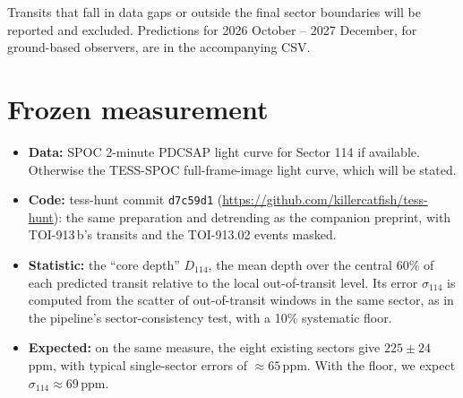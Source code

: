 \documentclass[11pt]{article}
\begin{document}
Transits that fall in data gaps or outside the final sector boundaries will be reported and excluded. Predictions for 2026 October -- 2027 December, for ground-based observers, are in the accompanying CSV.

\section*{Frozen measurement}
\begin{itemize}\itemsep2pt
\item \textbf{Data:} SPOC 2-minute PDCSAP light curve for Sector 114 if available. Otherwise the TESS-SPOC full-frame-image light curve, which will be stated.
\item \textbf{Code:} tess-hunt commit \texttt{d7c59d1} (\url{https://github.com/killercatfish/tess-hunt}): the same preparation and detrending as the companion preprint, with TOI-913\,b's transits and the TOI-913.02 events masked.
\item \textbf{Statistic:} the ``core depth'' $D_{114}$, the mean depth over the central 60\% of each predicted transit relative to the local out-of-transit level. Its error $\sigma_{114}$ is computed from the scatter of out-of-transit windows in the same sector, as in the pipeline's sector-consistency test, with a 10\% systematic floor.
\item \textbf{Expected:} on the same measure, the eight existing sectors give $225 \pm 24$\,ppm, with typical single-sector errors of $\approx65$\,ppm. With the floor, we expect $\sigma_{114} \approx 69$\,ppm.
\end{itemize}
\end{document}
